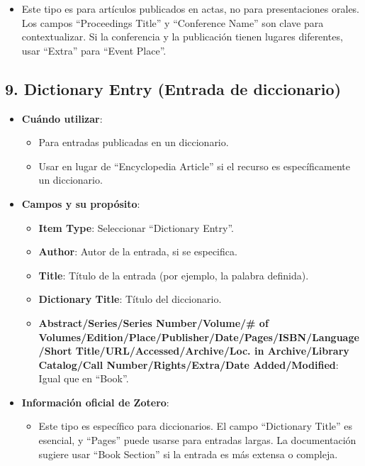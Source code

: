 \documentclass[
  jou,
  floatsintext,
  longtable,
  a4paper,
  nolmodern,
  notxfonts,
  notimes,
  colorlinks=true,linkcolor=blue,citecolor=blue,urlcolor=blue]{apa7}
\providecommand{\tightlist}{%
  \setlength{\itemsep}{0pt}\setlength{\parskip}{0pt}}
\begin{document}
\begin{itemize}
  \begin{itemize}
  \tightlist
  \item
    Este tipo es para artículos publicados en actas, no para
    presentaciones orales. Los campos ``Proceedings Title'' y
    ``Conference Name'' son clave para contextualizar. Si la conferencia
    y la publicación tienen lugares diferentes, usar ``Extra'' para
    ``Event Place''.
  \end{itemize}
\end{itemize}

\subsection{9. Dictionary Entry (Entrada de
diccionario)}\label{dictionary-entry-entrada-de-diccionario}

\begin{itemize}
\tightlist
\item
  \textbf{Cuándo utilizar}:

  \begin{itemize}
  \tightlist
  \item
    Para entradas publicadas en un diccionario.
  \item
    Usar en lugar de ``Encyclopedia Article'' si el recurso es
    específicamente un diccionario.
  \end{itemize}
\item
  \textbf{Campos y su propósito}:

  \begin{itemize}
  \tightlist
  \item
    \textbf{Item Type}: Seleccionar ``Dictionary Entry''.
  \item
    \textbf{Author}: Autor de la entrada, si se especifica.
  \item
    \textbf{Title}: Título de la entrada (por ejemplo, la palabra
    definida).
  \item
    \textbf{Dictionary Title}: Título del diccionario.
  \item
    \textbf{Abstract/Series/Series Number/Volume/\# of
    Volumes/Edition/Place/Publisher/Date/Pages/ISBN/Language/Short
    Title/URL/Accessed/Archive/Loc. in Archive/Library Catalog/Call
    Number/Rights/Extra/Date Added/Modified}: Igual que en ``Book''.
  \end{itemize}
\item
  \textbf{Información oficial de Zotero}:

  \begin{itemize}
  \tightlist
  \item
    Este tipo es específico para diccionarios. El campo ``Dictionary
    Title'' es esencial, y ``Pages'' puede usarse para entradas largas.
    La documentación sugiere usar ``Book Section'' si la entrada es más
    extensa o compleja.
  \end{itemize}
\end{itemize}
\end{document}
